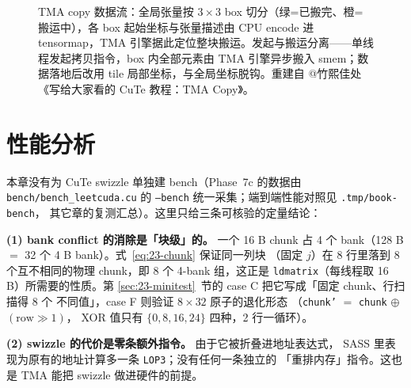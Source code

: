 \begin{figure}[htbp]
\caption{TMA copy 数据流：全局张量按 $3\times3$ box 切分（绿=已搬完、橙=搬运中），各 box 起始坐标与张量描述由 CPU encode 进 tensormap，TMA 引擎据此定位整块搬运。发起与搬运分离——单线程发起拷贝指令，box 内全部元素由 TMA 引擎异步搬入 smem；数据落地后改用 tile 局部坐标，与全局坐标脱钩。重建自 @竹熙佳处《写给大家看的 CuTe 教程：TMA Copy》。}
\label{fig:23-2}
\end{figure}

\section{性能分析}

本章没有为 CuTe swizzle 单独建 bench（Phase~7c 的数据由 \texttt{bench/bench\_leetcuda.cu}
的 \texttt{--bench} 统一采集；端到端性能对照见 \texttt{.\allowbreak{}tmp/\allowbreak{}book-bench}，
其它章的复测汇总）。这里只给三条可核验的定量结论：

\textbf{(1) bank conflict 的消除是「块级」的。} 一个 16 B chunk 占 4 个
bank（128 B $=$ 32 个 4 B bank）。式~\eqref{eq:23-chunk} 保证同一列块
（固定 $j$）在 8 行里落到 8 个互不相同的物理 chunk，即 8 个 4-bank
组，这正是 \texttt{ldmatrix}（每线程取 16 B）所需要的性质。第
\ref{sec:23-minitest}~节的 case C 把它写成「固定 chunk、行扫描得 8 个
不同值」，case F 则验证 $8\times32$ 原子的退化形态
（\texttt{chunk'} $=$ \texttt{chunk} $\oplus$ $(\text{row}\gg1)$，
XOR 值只有 $\{0,8,16,24\}$ 四种，2 行一循环）。

\textbf{(2) swizzle 的代价是零条额外指令。} 由于它被折叠进地址表达式，
SASS 里表现为原有的地址计算多一条 \texttt{LOP3}；没有任何一条独立的
「重排内存」指令。这也是 TMA 能把 swizzle 做进硬件的前提。

